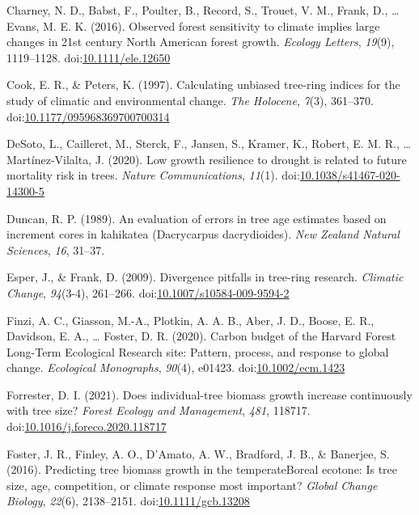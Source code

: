 \documentclass[
]{article}
\newlength{\cslhangindent}
\newenvironment{cslreferences}%
  {\setlength{\parindent}{0pt}%
  \everypar{\setlength{\hangindent}{\cslhangindent}}\ignorespaces}%
  {\par}
\begin{document}
\begin{cslreferences}
\leavevmode\hypertarget{ref-charney_observed_2016}{}%
Charney, N. D., Babst, F., Poulter, B., Record, S., Trouet, V. M.,
Frank, D., \ldots{} Evans, M. E. K. (2016). Observed forest sensitivity
to climate implies large changes in 21st century North American forest
growth. \emph{Ecology Letters}, \emph{19}(9), 1119--1128.
doi:\href{https://doi.org/10.1111/ele.12650}{10.1111/ele.12650}

\leavevmode\hypertarget{ref-cook_calculating_1997}{}%
Cook, E. R., \& Peters, K. (1997). Calculating unbiased tree-ring
indices for the study of climatic and environmental change. \emph{The
Holocene}, \emph{7}(3), 361--370.
doi:\href{https://doi.org/10.1177/095968369700700314}{10.1177/095968369700700314}

\leavevmode\hypertarget{ref-desoto_low_2020}{}%
DeSoto, L., Cailleret, M., Sterck, F., Jansen, S., Kramer, K., Robert,
E. M. R., \ldots{} Martínez-Vilalta, J. (2020). Low growth resilience to
drought is related to future mortality risk in trees. \emph{Nature
Communications}, \emph{11}(1).
doi:\href{https://doi.org/10.1038/s41467-020-14300-5}{10.1038/s41467-020-14300-5}

\leavevmode\hypertarget{ref-duncan_evaluation_1989}{}%
Duncan, R. P. (1989). An evaluation of errors in tree age estimates
based on increment cores in kahikatea (Dacrycarpus dacrydioides).
\emph{New Zealand Natural Sciences}, \emph{16}, 31--37.

\leavevmode\hypertarget{ref-esper_divergence_2009}{}%
Esper, J., \& Frank, D. (2009). Divergence pitfalls in tree-ring
research. \emph{Climatic Change}, \emph{94}(3-4), 261--266.
doi:\href{https://doi.org/10.1007/s10584-009-9594-2}{10.1007/s10584-009-9594-2}

\leavevmode\hypertarget{ref-finzi_carbon_2020}{}%
Finzi, A. C., Giasson, M.-A., Plotkin, A. A. B., Aber, J. D., Boose, E.
R., Davidson, E. A., \ldots{} Foster, D. R. (2020). Carbon budget of the
Harvard Forest Long-Term Ecological Research site: Pattern, process, and
response to global change. \emph{Ecological Monographs}, \emph{90}(4),
e01423. doi:\href{https://doi.org/10.1002/ecm.1423}{10.1002/ecm.1423}

\leavevmode\hypertarget{ref-forrester_does_2021}{}%
Forrester, D. I. (2021). Does individual-tree biomass growth increase
continuously with tree size? \emph{Forest Ecology and Management},
\emph{481}, 118717.
doi:\href{https://doi.org/10.1016/j.foreco.2020.118717}{10.1016/j.foreco.2020.118717}

\leavevmode\hypertarget{ref-foster_predicting_2016}{}%
Foster, J. R., Finley, A. O., D'Amato, A. W., Bradford, J. B., \&
Banerjee, S. (2016). Predicting tree biomass growth in the
temperateBoreal ecotone: Is tree size, age, competition, or climate
response most important? \emph{Global Change Biology}, \emph{22}(6),
2138--2151.
doi:\href{https://doi.org/10.1111/gcb.13208}{10.1111/gcb.13208}


\end{cslreferences}
\end{document}
